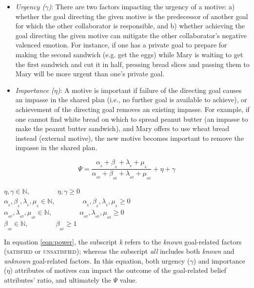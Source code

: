 \documentclass{article}
\begin{document}
\begin{itemize}[leftmargin=2pt]
  \setlength\itemsep{1mm}
  \item \textit{Urgency ($\gamma$)}: There are two factors impacting the urgency
  of a motive: a) whether the goal directing the given motive is the predecessor of
  another goal for which the other collaborator is responsible, and b) whether
  achieving the goal directing the given motive can mitigate the other
  collaborator's negative valenced emotion. For instance, if one has a private
  goal to prepare for making the second sandwich (e.g. get the eggs) while Mary
  is waiting to get the first sandwich and cut it in half, pressing bread slices
  and passing them to Mary will be more urgent than one's private goal.
  \item \textit{Importance ($\eta$)}: A motive is important if failure of the
  directing goal causes an impasse in the shared plan (i.e., no further goal is
  available to achieve), or achievement of the directing goal removes an
  existing impasse. For example, if one cannot find white bread on which to
  spread peanut butter (an impasse to make the peanut butter sandwich), and Mary
  offers to use wheat bread instead (external motive), the new motive becomes
  important to remove the impasse in the shared plan.
\end{itemize}

\vspace*{-2mm}
\begin{equation}
    \Psi = \frac{\alpha_{_k} + \beta_{_k} + \lambda_{_k} +
    \mu_{_k}}{\alpha_{_{all}} + \beta_{_{all}} + \lambda_{_{all}} +
    \mu_{_{all}}} + \eta + \gamma
    \label{eqn:power}
\end{equation}

\vspace*{1mm}
\begin{center} 
    $\eta, \gamma \in \mathbb{N}, \qquad\qquad \eta, \gamma \geq 0$\\
    $\alpha_{_k}, \beta_{_k}, \lambda_{_k}, \mu_{_k} \in \mathbb{N},
    \qquad\qquad \alpha_{_k}, \beta_{_k}, \lambda_{_k}, \mu_{_k} \geq 0$\\
    $\alpha_{_{all}}, \lambda_{_{all}}, \mu_{_{all}} \in \mathbb{N},
    \qquad\qquad \alpha_{_{all}}, \lambda_{_{all}}, \mu_{_{all}} \geq 0$\\
    $\beta_{_{all}} \in \mathbb{N}, \qquad\qquad \beta_{_{all}} \geq 1$
\end{center}

In equation \ref{eqn:power}, the subscript \textit{k} refers to the
\textit{known} goal-related factors (\textsc{satisfied} or
\textsc{unsatisfied}); whereas the subscript \textit{all} includes both
\textit{known} and \textit{unknown} goal-related factors. In this equation, both
urgency ($\gamma$) and importance ($\eta$) attributes of motives can impact the
outcome of the goal-related belief attributes' ratio, and ultimately the $\Psi$
value.
\end{document}
